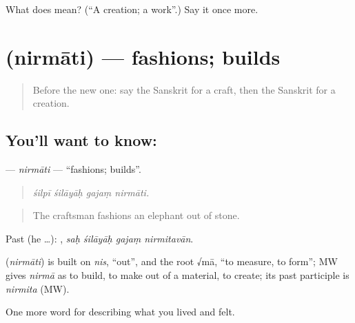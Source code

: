 \begin{tcolorbox}[breakable,colback=teal!4,colframe=teal!35!black,title={Before you move on}]
What does  mean? (\textquotedblleft{}A creation; a work\textquotedblright{}.) Say it once more.
\end{tcolorbox}
\section[\texorpdfstring{\sk{निर्माति} (nirmāti)}{निर्माति (nirmāti)}]{ (nirmāti) — fashions; builds}

\label{lesson:SA-C519-nirmati}



\begin{quote}
Before the new one: say the Sanskrit for a craft, then the Sanskrit for a creation.
\end{quote}

\subsection*{You'll want to know: }
\textbf{} — \emph{nirmāti} — \textquotedblleft{}fashions; builds\textquotedblright{}.

\begin{quote}
   
\end{quote}

\begin{quote}
\emph{śilpī śilāyāḥ gajaṃ nirmāti.}
\end{quote}

\begin{quote}
The craftsman fashions an elephant out of stone.
\end{quote}

Past (he …):    , \emph{saḥ śilāyāḥ gajaṃ nirmitavān}.

\begin{cousinweb}
\textbf{} (\emph{nirmāti}) is built on \emph{nis}, \textquotedblleft{}out\textquotedblright{}, and the root √mā, \textquotedblleft{}to measure, to form\textquotedblright{}; MW gives \emph{nirmā} as to build, to make out of a material, to create; its past participle is \emph{nirmita} (MW).
\end{cousinweb}

\begin{grammarlens}[title={What you've built}]
One more word for describing what you lived and felt.
\end{grammarlens}

